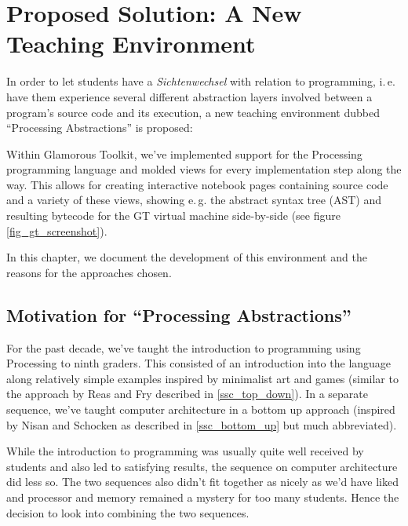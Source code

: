 
\chapter{Proposed Solution: A New Teaching Environment} \label{ch_pa}

In order to let students have a \emph{Sichtenwechsel} with relation to programming, i.\,e. have them experience several different abstraction layers involved between a program's source code and its execution, a new teaching environment dubbed ``Processing Abstractions'' is proposed:

Within Glamorous Toolkit, we've implemented support for the Processing programming language and molded views for every implementation step along the way. This allows for creating interactive notebook pages containing source code and a variety of these views, showing e.\,g. the abstract syntax tree (AST) and resulting bytecode for the GT virtual machine side-by-side (see figure \ref{fig_gt_screenshot}).

In this chapter, we document the development of this environment and the reasons for the approaches chosen.


\section{Motivation for ``Processing Abstractions''}

For the past decade, we've taught the introduction to programming using Processing to ninth graders. This consisted of an introduction into the language along relatively simple examples inspired by minimalist art and games (similar to the approach by Reas and Fry \cite{Rea14} described in \ref{ssc_top_down}). In a separate sequence, we've taught computer architecture in a bottom up approach (inspired by Nisan and Schocken \cite{Nis21} as described in \ref{ssc_bottom_up} but much abbreviated).

While the introduction to programming was usually quite well received by students and also led to satisfying results, the sequence on computer architecture did less so. The two sequences also didn't fit together as nicely as we'd have liked and processor and memory remained a mystery for too many students. Hence the decision to look into combining the two sequences.


